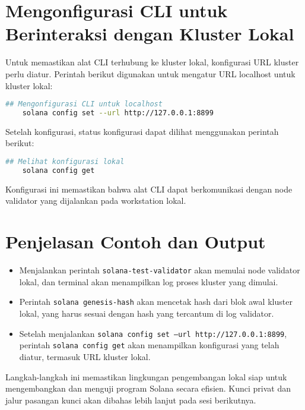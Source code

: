 \section{Mengonfigurasi CLI untuk Berinteraksi dengan Kluster Lokal}

Untuk memastikan alat CLI terhubung ke kluster lokal, konfigurasi URL kluster perlu diatur. Perintah berikut digunakan untuk mengatur URL localhost untuk kluster lokal:
\begin{lstlisting}[language=bash, caption={Mengonfigurasi Alat CLI}]
	## Mengonfigurasi CLI untuk localhost
	solana config set --url http://127.0.0.1:8899
\end{lstlisting}

Setelah konfigurasi, status konfigurasi dapat dilihat menggunakan perintah berikut:
\begin{lstlisting}[language=bash, caption={Melihat Konfigurasi Lokal}]
	## Melihat konfigurasi lokal
	solana config get
\end{lstlisting}

Konfigurasi ini memastikan bahwa alat CLI dapat berkomunikasi dengan node validator yang dijalankan pada workstation lokal.

\section{Penjelasan Contoh dan Output}

\begin{itemize}
	\item Menjalankan perintah \texttt{solana-test-validator} akan memulai node validator lokal, dan terminal akan menampilkan log proses kluster yang dimulai.
	\item Perintah \texttt{solana genesis-hash} akan mencetak hash dari blok awal kluster lokal, yang harus sesuai dengan hash yang tercantum di log validator.
	\item Setelah menjalankan \texttt{solana config set --url http://127.0.0.1:8899}, perintah \texttt{solana config get} akan menampilkan konfigurasi yang telah diatur, termasuk URL kluster lokal.
\end{itemize}

Langkah-langkah ini memastikan lingkungan pengembangan lokal siap untuk mengembangkan dan menguji program Solana secara efisien. Kunci privat dan jalur pasangan kunci akan dibahas lebih lanjut pada sesi berikutnya.

